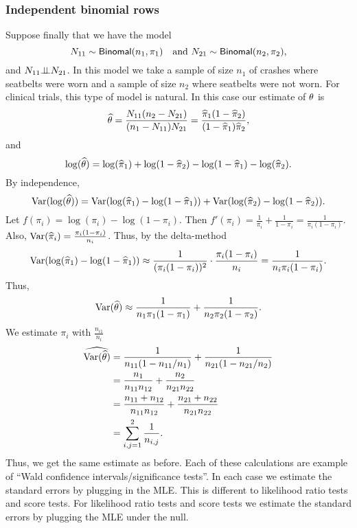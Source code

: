 \subsubsection{Independent binomial rows}
Suppose finally that we have the model
\[N_{11} \sim \mathsf{Binomal}(n_1, \pi_1) ~~ \text{ and } N_{21} \sim \mathsf{Binomal}(n_2, \pi_2), \]
and $N_{11} {\perp\!\!\!\perp} N_{21}$. In this model we take a sample of size $n_1$ of crashes where seatbelts were worn and a sample of size $n_2$ where seatbelts were not worn. For clinical trials, this type of model is natural. In this case our estimate of ${\theta}$ is 
\[\widehat{{\theta}} = \frac{N_{11}(n_2-N_{21})}{(n_1-N_{11})N_{21}} = \frac{\widehat{\pi}_1(1-\widehat{\pi}_2)}{(1-\widehat{\pi}_1)\widehat{\pi}_2}, \]
and 
\[\log(\widehat{{\theta}}) = \log(\widehat{\pi}_{1})+\log(1-\widehat{\pi}_{2}) - \log(1-\widehat{\pi}_{1})-\log(\widehat{\pi}_{2}). \]
By independence,
\[\operatorname{Var}(\log(\widehat{{\theta}})) = \operatorname{Var}(\log(\widehat{\pi}_{1})-\log(1-\widehat{\pi}_{1}))+\operatorname{Var}(\log(\widehat{\pi}_{2})-\log(1-\widehat{\pi}_{2})). \]
Let $f(\pi_i) = \log(\pi_i)-\log(1-\pi_i)$. Then $f'(\pi_i) = \frac{1}{\pi_i}+\frac{1}{1-\pi_i}=\frac{1}{\pi_i(1-\pi_i)}$. Also, $\operatorname{Var}(\widehat{\pi}_i) = \frac{\pi_i(1-\pi_i)}{n_i}$. Thus, by the delta-method
\[\operatorname{Var}(\log(\widehat{\pi}_{1})-\log(1-\widehat{\pi}_{1})) \approx \frac{1}{(\pi_i(1-\pi_i))^2} \cdot \frac{\pi_i(1-\pi_i)}{n_i} = \frac{1}{n_i\pi_i(1-\pi_i)}. \]
Thus,
\[\operatorname{Var}(\widehat{{\theta}}) \approx \frac{1}{n_1\pi_1(1-\pi_1)}+\frac{1}{n_2\pi_2(1-\pi_2)}.\]
We estimate $\pi_i$ with $\frac{n_{i1}}{n_i}$
\begin{align*}
    \widehat{\operatorname{Var}(\widehat{{\theta}})} &= \frac{1}{n_{11}(1-n_{11}/n_1)}+\frac{1}{n_{21}(1-n_{21}/n_2)} \\
    &= \frac{n_1}{n_{11}n_{12}}+\frac{n_2}{n_{21}n_{22}}\\
    &=\frac{n_{11}+n_{12}}{n_{11}n_{12}}+\frac{n_{21}+n_{22}}{n_{21}n_{22}}\\
    &=\sum_{i,j=1}^2 \frac{1}{n_{i,j}}.
\end{align*}
Thus, we get the same estimate as before. Each of these calculations are example of ``Wald confidence intervals/significance tests''. In each case we estimate the standard errors by plugging in the MLE. This is different to likelihood ratio tests and score tests. For likelihood ratio tests and score tests we estimate the standard errors by plugging the MLE under the null.
